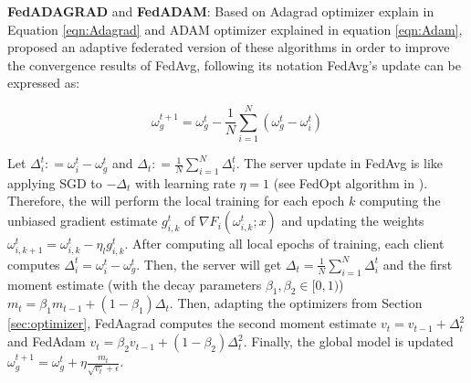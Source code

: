 \textbf{FedADAGRAD} and \textbf{FedADAM}: Based on Adagrad optimizer explain in Equation \ref{eqn:Adagrad} and ADAM optimizer explained in equation \ref{eqn:Adam}, \cite{reddi2021} proposed an adaptive federated version of these algorithms in order to improve the convergence results of FedAvg, following its notation FedAvg's update can be expressed as:

\begin{equation*}
  \omega_g^{t+1} = \omega_g^t - \frac{1}{N} \sum_{i=1}^N (\omega_g^t - \omega_i^t)
\end{equation*}

Let $\Delta_i^t \colon = \omega_i^t - \omega_g^t$ and $\Delta_t \colon = \frac{1}{N} \sum_{i=1}^N \Delta_i^t$. The server update in FedAvg is like applying SGD to $-\Delta_t$ with learning rate $\eta=1$ (see FedOpt algorithm in \cite{reddi2021}). Therefore, the will perform the local training for each epoch $k$ computing the unbiased gradient estimate $g_{i,k}^t$ of $\nabla F_i(\omega_{i,k}^t; x)$ and updating the weights $\omega_{i,k+1}^t = \omega_{i,k}^t - \eta_l g_{i,k}^t$. After computing all local epochs of training, each client computes $\Delta_i^t = \omega_i^t - \omega_g^t$. Then, the server will get $\Delta_t = \frac{1}{N}\sum_{i=1}^N \Delta_i^t$ and the first moment estimate (with the decay parameters $\beta_1,\beta_2 \in [0,1)$) $m_t = \beta_1 m_{t-1} + (1-\beta_1)\Delta_t$. Then, adapting the optimizers from Section \ref{sec:optimizer}, FedAagrad computes the second moment estimate $v_t = v_{t-1} + \Delta_t^2$ and FedAdam $v_t = \beta_2 v_{t-1} + (1-\beta_2)\Delta_t^2$. Finally, the global model is updated $\omega_g^{t+1} = \omega_g^t + \eta \frac{m_t}{\sqrt{v_t} + \epsilon}$.
